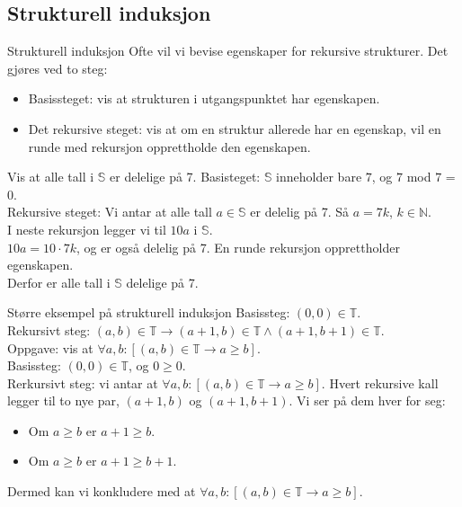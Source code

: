 \subsection{Strukturell induksjon}
\begin{frame}{Strukturell induksjon}
    Ofte vil vi bevise egenskaper for rekursive strukturer. Det gjøres ved to steg:
    \begin{itemize}
        \item Basissteget: vis at strukturen i utgangspunktet har egenskapen.
        \item Det rekursive steget: vis at om en struktur allerede har en egenskap, vil en runde med rekursjon opprettholde den egenskapen.
    \end{itemize}
    
    \pause
    \begin{block}{Vis at alle tall i $\mathbb{S}$ er delelige på 7.}
        \pause
        Basisteget: $\mathbb{S}$ inneholder bare $7$, og $7$ mod $7$ = 0. \checkmark\\
        \pause
        Rekursive steget: Vi antar at alle tall $a \in \mathbb{S}$ er delelig på 7. Så $a = 7k$, $k \in \mathbb{N}$.\\
        \pause
        I neste rekursjon legger vi til $10a$ i $\mathbb{S}$.\\
        \pause
        $10a=10 \cdot 7k$, og er også delelig på 7. En runde rekursjon opprettholder egenskapen.\checkmark\\
        \pause
        Derfor er alle tall i $\mathbb{S}$ delelige på 7.
    \end{block}
\end{frame}

\begin{frame}{Større eksempel på strukturell induksjon}
    Basissteg: $(0, 0) \in \mathbb{T}$.\\
    Rekursivt steg: $(a, b) \in \mathbb{T} \rightarrow (a+1, b) \in \mathbb{T} \land (a+1, b+1) \in \mathbb{T}$.\\
    
    Oppgave: vis at $\forall a, b : [(a, b) \in \mathbb{T} \rightarrow a \geq b]$.\\
    
    \pause
    Basissteg: $(0, 0) \in \mathbb{T}$, og $0 \geq 0$. \checkmark\\
    Rerkursivt steg: vi antar at $\forall a, b : [(a, b) \in \mathbb{T} \rightarrow a \geq b]$. Hvert rekursive kall legger til to nye par, $(a+1, b)$ og $(a+1, b+1)$. Vi ser på dem hver for seg:
    \begin{itemize}
        \item Om $a \geq b$ er $a+1 \geq b$.
        \item Om $a \geq b$ er $a+1 \geq b+1$. \checkmark
    \end{itemize}
    Dermed kan vi konkludere med at $\forall a, b : [(a, b) \in \mathbb{T} \rightarrow a \geq b]$.
\end{frame}


